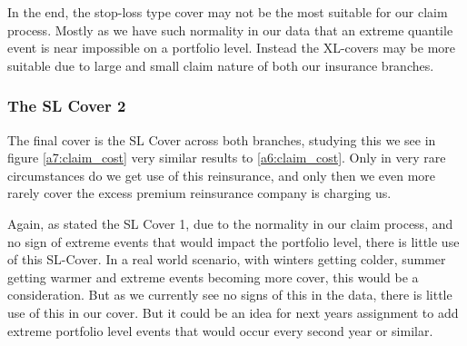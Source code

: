 \documentclass[11pt]{article}
\begin{document}
In the end, the stop-loss type cover may not be the most suitable for our claim process.
Mostly as we have such normality in our data that an extreme quantile event is near impossible on a portfolio level.
Instead the XL-covers may be more suitable due to large and small claim nature of both our insurance branches.


\subsubsection{The SL Cover 2}
The final cover is the SL Cover across both branches, studying this we see in figure \ref{a7:claim_cost} very similar results to \ref{a6:claim_cost}.
Only in very rare circumstances do we get use of this reinsurance, and only then we even more rarely cover the excess premium reinsurance company is charging us.

Again, as stated the SL Cover 1, due to the normality in our claim process, and no sign of extreme events that would impact the portfolio level, there is little use of this SL-Cover.
In a real world scenario, with winters getting colder,   summer getting warmer and extreme events becoming more cover, this would be a consideration.
But as we currently see no signs of this in the data, there is little use of this in our cover.
But it could be an idea for next years assignment to add extreme portfolio level events that would occur every second year or similar.
\end{document}
